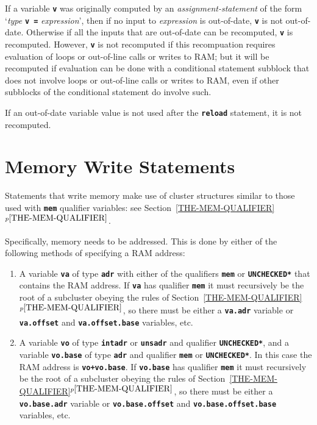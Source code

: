\documentclass[12pt]{article}
\newcommand{\TT}[1]{{\tt \bfseries #1}}
\newcommand{\itemref}[1]{\ref{#1}$^{p\pageref{#1}}$}
\newcommand{\EOL}{\penalty \exhyphenpenalty}
\begin{document}
If a variable \TT{v} was originally computed by
an {\em assignment-statement}
of the form `{\em type} \TT{v =} {\em expression}', then if
no input to {\em expression} is out-of-date, \TT{v} is not out-of-date.
Otherwise if all the inputs that are out-of-date can be recomputed,
\TT{v} is recomputed.  However, \TT{v} is not recomputed if this
recompuation requires evaluation of loops or out-of-line calls or
writes to RAM;
but it will be recomputed if evaluation can be done with a conditional
statement subblock that does not involve loops or out-of-line calls or
writes to RAM,
even if other subblocks of the conditional statement do involve such.

If an out-of-date variable value is not used after the \TT{reload} statement,
it is not recomputed.

\section{Memory Write Statements}
\label{MEMORY-WRITE-STATEMENTS}

Statements that write memory make use of cluster structures
similar to those used with
\TT{mem} qualifier variables:
see Section~\itemref{THE-MEM-QUALIFIER}.

Specifically, memory needs to be addressed.  This is done by either
of the following methods of specifying a RAM address:
\begin{enumerate}
\item
A variable \TT{va} of type \TT{adr} with either of the qualifiers
\TT{mem} or \TT{*UNCHECKED*} that contains the RAM address.
If \TT{va} has qualifier \TT{mem} it must recursively be
the root of a subcluster obeying
the rules of Section~\itemref{THE-MEM-QUALIFIER},
so there must be either a \TT{va.adr} variable
or \TT{va.offset} and \TT{va.offset\EOL .base}
variables, etc.


\item
A variable \TT{vo} of type \TT{intadr} or \TT{unsadr} and
qualifier \TT{*UNCHECKED*}, and
a variable \TT{vo.base} of type \TT{adr} and qualifier \TT{mem}
or \TT{*UNCHECKED*}.
In this case the RAM address is \TT{vo+vo.base}.
If \TT{vo.base} has qualifier \TT{mem} it must recursively be
the root of a subcluster obeying
the rules of Section~\itemref{THE-MEM-QUALIFIER},
so there must be either a \TT{vo.base.adr} variable
or \TT{vo.base.offset} and \TT{vo.base.offset\EOL .base}
variables, etc.

\end{enumerate}
\end{document}

